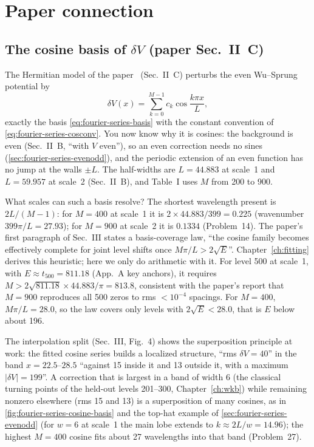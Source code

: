 \section{Paper connection}\label{sec:fourier-series-paper}

\subsection{The cosine basis of \texorpdfstring{$\delta V$}{delta V} (paper Sec.~II~C)}

The Hermitian model of the paper~\cite{soniR1} (Sec.~II~C) perturbs the even Wu--Sprung potential by
\begin{equation}
\delta V(x)=\sum_{k=0}^{M-1}c_k\cos\frac{k\pi x}{L},
\end{equation}
exactly the basis \cref{eq:fourier-series-basis} with the constant convention of \cref{eq:fourier-series-cosconv}. You now know why it is cosines: the background is even (Sec.~II~B, ``with $V$ even''), so an even correction needs no sines (\cref{sec:fourier-series-evenodd}), and the periodic extension of an even function has no jump at the walls $\pm L$. The half-widths are $L=44.883$ at scale~1 and $L=59.957$ at scale~2 (Sec.~II~B), and Table~I uses $M$ from 200 to 900.

What scales can such a basis resolve? The shortest wavelength present is $2L/(M-1)$: for $M=400$ at scale~1 it is $2\times44.883/399=0.225$ (wavenumber $399\pi/L=27.93$); for $M=900$ at scale~2 it is $0.1334$ (Problem~14). The paper's first paragraph of Sec.~III states a basis-coverage law, ``the cosine family becomes effectively complete for joint level shifts once $M\pi/L>2\sqrt E$''. Chapter~\ref{ch:fitting} derives this heuristic; here we only do arithmetic with it. For level 500 at scale~1, with $E\approx t_{500}=811.18$ (App.~A key anchors), it requires $M>2\sqrt{811.18}\times44.883/\pi=813.8$, consistent with the paper's report that $M=900$ reproduces all 500 zeros to rms $<10^{-4}$ spacings. For $M=400$, $M\pi/L=28.0$, so the law covers only levels with $2\sqrt E<28.0$, that is $E$ below about 196.

The interpolation split (Sec.~III, Fig.~4) shows the superposition principle at work: the fitted cosine series builds a localized structure, ``rms $\delta V=40$'' in the band $x=22.5$--$28.5$ ``against 15 inside it and 13 outside it, with a maximum $|\delta V|=199$''. A correction that is largest in a band of width 6 (the classical turning points of the held-out levels 201--300, Chapter~\ref{ch:wkb}) while remaining nonzero elsewhere (rms 15 and 13) is a superposition of many cosines, as in \cref{fig:fourier-series-cosine-basis} and the top-hat example of \cref{sec:fourier-series-evenodd} (for $w=6$ at scale~1 the main lobe extends to $k\approx2L/w=14.96$); the highest $M=400$ cosine fits about 27 wavelengths into that band (Problem~27).

